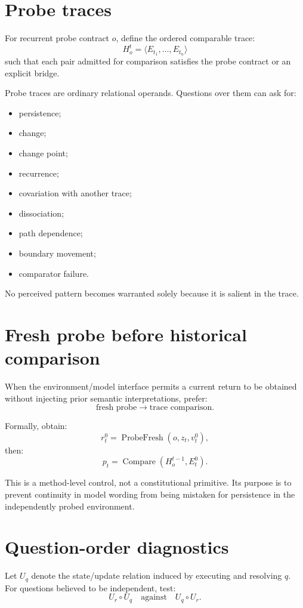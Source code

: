 \documentclass[11pt,oneside]{article}
\begin{document}
\section{Probe traces}

For recurrent probe contract \(o\), define the ordered comparable trace:
\[
\boxed{
H_o^t=
\langle E_{t_1},\ldots,E_{t_n}\rangle
}
\]
such that each pair admitted for comparison satisfies the probe contract or an explicit bridge.

Probe traces are ordinary relational operands.  Questions over them can ask for:
\begin{itemize}
\item persistence;
\item change;
\item change point;
\item recurrence;
\item covariation with another trace;
\item dissociation;
\item path dependence;
\item boundary movement;
\item comparator failure.
\end{itemize}

No perceived pattern becomes warranted solely because it is salient in the trace.

\section{Fresh probe before historical comparison}

When the environment/model interface permits a current return to be obtained without injecting prior semantic interpretations, prefer:
\[
\boxed{
\text{fresh probe}
\longrightarrow
\text{trace comparison}.
}
\]

Formally, obtain:
\[
r_t^0=\operatorname{ProbeFresh}(o,z_t,v_t^0),
\]
then:
\[
p_t=
\operatorname{Compare}(H_o^{t-1},E_t^0).
\]

This is a method-level control, not a constitutional primitive.  Its purpose is to prevent continuity in model wording from being mistaken for persistence in the independently probed environment.

\section{Question-order diagnostics}

Let \(U_q\) denote the state/update relation induced by executing and resolving \(q\).  For questions believed to be independent, test:
\[
U_r\circ U_q
\quad\text{against}\quad
U_q\circ U_r.
\]
\end{document}
